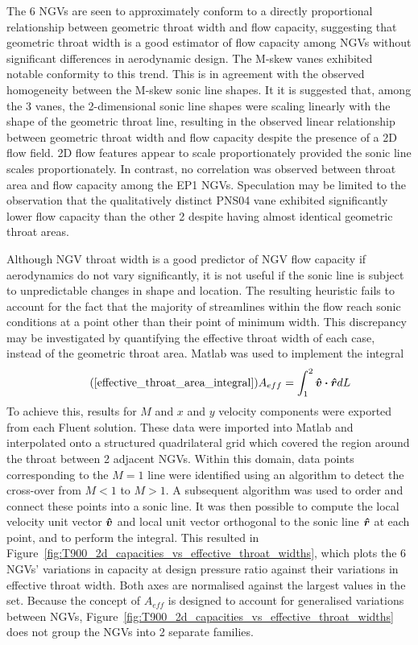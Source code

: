 \documentclass[a4paper, 11pt, oneside]{report}
\begin{document}
The 6 NGVs are seen to approximately conform to a directly proportional relationship between geometric throat width and flow capacity, suggesting that geometric throat width is a good estimator of flow capacity among NGVs without significant differences in aerodynamic design. The M-skew vanes exhibited notable conformity to this trend. This is in agreement with the observed homogeneity between the M-skew sonic line shapes. It it is suggested that, among the 3 vanes, the 2-dimensional sonic line shapes were scaling linearly with the shape of the geometric throat line, resulting in the observed linear relationship between geometric throat width and flow capacity despite the presence of a 2D flow field. 2D flow features appear to scale proportionately provided the sonic line scales proportionately. In contrast, no correlation was observed between throat area and flow capacity among the EP1 NGVs. Speculation may be limited to the observation that the qualitatively distinct PNS04 vane exhibited significantly lower flow capacity than the other 2 despite having almost identical geometric throat areas.

Although NGV throat width is a good predictor of NGV flow capacity if aerodynamics do not vary significantly, it is not useful if the sonic line is subject to unpredictable changes in shape and location. The resulting heuristic fails to account for the fact that the majority of streamlines within the flow reach sonic conditions at a point other than their point of minimum width. This discrepancy may be investigated by quantifying the effective throat width of each case, instead of the geometric throat area. Matlab was used to implement the integral
\begin{equation}\tag{\ref{effective_throat_area_integral}}
	A_{eff} = 
	\int_{1}^2 \vu*{v} \vdot \vu*{r} dL
\end{equation}
To achieve this, results for $M$ and $x$ and $y$ velocity components were exported from each Fluent solution. These data were imported into Matlab and interpolated onto a structured quadrilateral grid which covered the region around the throat between 2 adjacent NGVs. Within this domain, data points corresponding to the $M=1$ line were identified using an algorithm to detect the cross-over from $M<1$ to $M>1$. A subsequent algorithm was used to order and connect these points into a sonic line. It was then possible to compute the local velocity unit vector $\vu*{v}$ and local unit vector orthogonal to the sonic line $\vu*{r}$ at each point, and to perform the integral. This resulted in Figure~\ref{fig:T900_2d_capacities_vs_effective_throat_widths}, which plots the 6 NGVs' variations in capacity at design pressure ratio against their variations in effective throat width. Both axes are normalised against the largest values in the set. Because the concept of $A_{eff}$ is designed to account for generalised variations between NGVs, Figure~\ref{fig:T900_2d_capacities_vs_effective_throat_widths} does not group the NGVs into 2 separate families.
\end{document}
